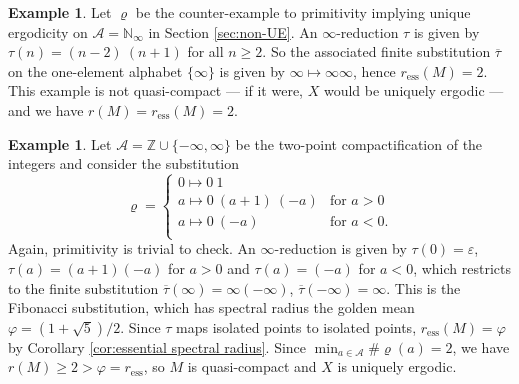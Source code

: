 \documentclass[11pt]{amsart}
\numberwithin{equation}{section}
\theoremstyle{plain}
\theoremstyle{definition}
\newtheorem{example}[theorem]{Example}
\newcommand{\Z}{{\mathbb Z}}
\newcommand{\N}{{\mathbb N}}
\newcommand{\mc}{\mathcal}
\newcommand{\A}{\mc A}
\newcommand{\sub}{\varrho}
\begin{document}
\begin{example}
Let \(\sub\) be the counter-example to primitivity implying unique ergodicity on \(\A = \N_\infty\) in Section \ref{sec:non-UE}. An \(\infty\)-reduction \(\tau\) is given by \(\tau(n) = (n-2) \ (n+1)\) for all \(n \geq 2\). So the associated finite substitution \(\overline{\tau}\) on the one-element alphabet \(\{\infty\}\) is given by \(\infty \mapsto \infty \infty\), hence \(r_\mathrm{ess}(M) = 2\). This example is not quasi-compact --- if it were, \(X\) would be uniquely ergodic --- and we have \(r(M) = r_\mathrm{ess}(M) = 2\).
\end{example}

\begin{example}
Let \(\A = \Z \cup \{-\infty, \infty\}\) be the two-point compactification of the integers and consider the substitution
\[
\sub =
\begin{cases}
0 \mapsto 0 \ 1           & \\
a \mapsto 0 \ (a+1) \ (-a) & \text{for } a > 0 \\
a \mapsto 0 \ (-a)       & \text{for } a < 0 . \\
\end{cases}
\]
Again, primitivity is trivial to check. An \(\infty\)-reduction is given by \(\tau(0) = \varepsilon\), \(\tau(a) = (a+1) (-a)\) for \(a > 0\) and \(\tau(a) = (-a)\) for \(a < 0\), which restricts to the finite substitution \(\overline{\tau}(\infty) = \infty (-\infty)\), \(\overline{\tau}(-\infty) = \infty\). This is the Fibonacci substitution, which has spectral radius the golden mean \(\varphi = (1+\sqrt{5})/2\). Since \(\tau\) maps isolated points to isolated points, \(r_\mathrm{ess}(M) = \varphi\) by Corollary \ref{cor:essential spectral radius}. Since \(\min_{a \in \A} \# \sub(a) = 2\), we have \(r(M) \geq 2 > \varphi = r_\mathrm{ess}\), so \(M\) is quasi-compact and \(X\) is uniquely ergodic.
\end{example}
\end{document}
